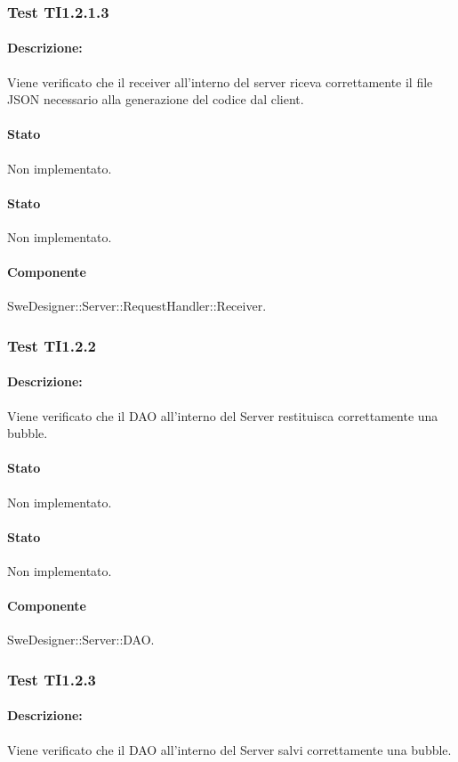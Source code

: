 \documentclass[../PianoDiQualifica.tex]{subfiles}
\begin{document}
	\subsubsection{Test TI1.2.1.3}
	\paragraph{Descrizione:} Viene verificato che il receiver all'interno del server riceva correttamente il file JSON necessario alla generazione del codice dal client.
	\paragraph{Stato} Non implementato.
	\paragraph{Stato} Non implementato.
	\paragraph{Componente} SweDesigner::Server::RequestHandler::Receiver.
	\subsubsection{Test TI1.2.2}
	\paragraph{Descrizione:} Viene verificato che il DAO all'interno del Server restituisca correttamente una bubble.
	\paragraph{Stato} Non implementato.
	\paragraph{Stato} Non implementato.
	\paragraph{Componente} SweDesigner::Server::DAO.
	
	\subsubsection{Test TI1.2.3}
	\paragraph{Descrizione:} Viene verificato che il DAO all'interno del Server salvi correttamente una bubble.
\end{document}
